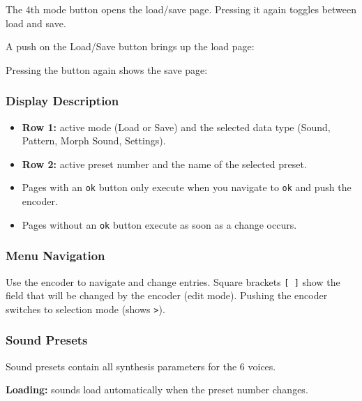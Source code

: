 The 4th mode button opens the load/save page. Pressing it again toggles
between load and save.

A push on the Load/Save button brings up the load page:


Pressing the button again shows the save page:


\subsubsection{Display Description}\label{display-description}

\begin{itemize}
\tightlist
\item
  \textbf{Row 1:} active mode (Load or Save) and the selected data type
  (Sound, Pattern, Morph Sound, Settings).
\item
  \textbf{Row 2:} active preset number and the name of the selected
  preset.
\item
  Pages with an \texttt{ok} button only execute when you navigate to
  \texttt{ok} and push the encoder.
\item
  Pages without an \texttt{ok} button execute as soon as a change
  occurs.
\end{itemize}

\subsubsection{Menu Navigation}\label{menu-navigation}

Use the encoder to navigate and change entries. Square brackets
\texttt{{[}\ {]}} show the field that will be changed by the encoder
(edit mode). Pushing the encoder switches to selection mode (shows
\texttt{\textgreater{}}).


\subsubsection{Sound Presets}\label{sound-presets}

Sound presets contain all synthesis parameters for the 6 voices.

\textbf{Loading:} sounds load automatically when the preset number
changes.


